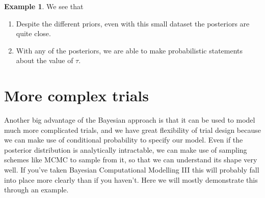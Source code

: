 \documentclass[
  openany]{book}
\providecommand{\tightlist}{%
  \setlength{\itemsep}{0pt}\setlength{\parskip}{0pt}}
\theoremstyle{definition}
\theoremstyle{definition}
\newtheorem{example}{Example}[chapter]
\theoremstyle{definition}
\theoremstyle{definition}
\theoremstyle{remark}
\begin{document}
\begin{example}
We see that

\begin{enumerate}
\def\labelenumi{\arabic{enumi}.}
\tightlist
\item
  Despite the different priors, even with this small dataset the posteriors are quite close.
\item
  With any of the posteriors, we are able to make probabilistic statements about the value of \(\tau\).
\end{enumerate}

\end{example}

\section{More complex trials}\label{more-complex-trials}

Another big advantage of the Bayesian approach is that it can be used to model much more complicated trials, and we have great flexibility of trial design because we can make use of conditional probability to specify our model. Even if the posterior distribution is analytically intractable, we can make use of sampling schemes like MCMC to sample from it, so that we can understand its shape very well. If you've taken Bayesian Computational Modelling III this will probably fall into place more clearly than if you haven't. Here we will mostly demonstrate this through an example.
\end{document}
